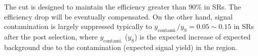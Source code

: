 The cut is designed to maintain the efficiency greater than $90\%$ in SRs. The efficiency drop will be eventually compensated. On the other hand, signal contamination is largely suppressed typically to $y_{\mathrm{contami.}}/y_{\mathrm{S}} = 0.05\sim0.15$ in SRs after the post selection, where $y_{\mathrm{contami.}}$ ($y_{\mathrm{S}}$) is the expected increase of expected background due to the contamination (expected signal yield) in the region. \\

% 




